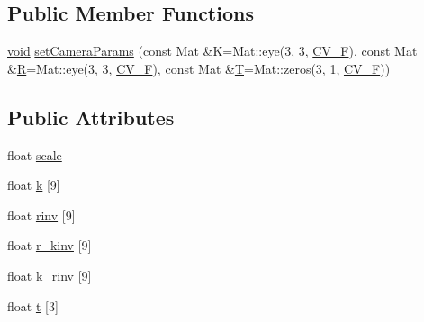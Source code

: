 \subsection*{Public Member Functions}
\begin{DoxyCompactItemize}
\item 
\hyperlink{legacy_8hpp_a8bb47f092d473522721002c86c13b94e}{void} \hyperlink{structcv_1_1detail_1_1ProjectorBase_a8b2f0830601a47ac5c51e3d08c3bd7c5}{set\-Camera\-Params} (const Mat \&K=Mat\-::eye(3, 3, \hyperlink{core_2types__c_8h_a4a3def5d72b74bed31f5f8ab7676099c}{C\-V\-\_\-F}), const Mat \&\hyperlink{imgproc__c_8h_a51837f120208319f026dc8c4a71e56e0}{R}=Mat\-::eye(3, 3, \hyperlink{core_2types__c_8h_a4a3def5d72b74bed31f5f8ab7676099c}{C\-V\-\_\-F}), const Mat \&\hyperlink{calib3d_8hpp_a3efb9551a871ddd0463079a808916717}{T}=Mat\-::zeros(3, 1, \hyperlink{core_2types__c_8h_a4a3def5d72b74bed31f5f8ab7676099c}{C\-V\-\_\-F}))
\end{DoxyCompactItemize}
\subsection*{Public Attributes}
\begin{DoxyCompactItemize}
\item 
float \hyperlink{structcv_1_1detail_1_1ProjectorBase_a4677711ed88bb184e14781e716efe4c3}{scale}
\item 
float \hyperlink{structcv_1_1detail_1_1ProjectorBase_a13770d3c6e1e9b022ad33e72bb714af4}{k} \mbox{[}9\mbox{]}
\item 
float \hyperlink{structcv_1_1detail_1_1ProjectorBase_a4665331ebb0ea7db6d4f48151da35509}{rinv} \mbox{[}9\mbox{]}
\item 
float \hyperlink{structcv_1_1detail_1_1ProjectorBase_a2f30b2a02c9fddf1bacb47a805b00c82}{r\-\_\-kinv} \mbox{[}9\mbox{]}
\item 
float \hyperlink{structcv_1_1detail_1_1ProjectorBase_a7a37f06fe4a12966ac6fb98d21cc1815}{k\-\_\-rinv} \mbox{[}9\mbox{]}
\item 
float \hyperlink{structcv_1_1detail_1_1ProjectorBase_a337fa3c01b64e4a6ad8576442793a233}{t} \mbox{[}3\mbox{]}
\end{DoxyCompactItemize}


